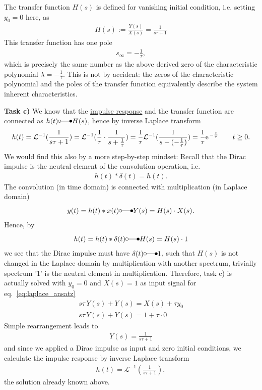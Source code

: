\documentclass[11pt,a4paper,DIV=12]{scrartcl}
\begin{document}
The transfer function $H(s)$ is defined for vanishing initial condition, i.e. setting $y_0=0$ here, as
\begin{align}
H(s) := \frac{Y(s)}{X(s)} = \frac{1}{s \tau + 1}
\end{align}
This transfer function has one pole
\begin{align}
s_\infty = -\frac{1}{\tau},
\end{align}
which is precisely the same number as the above derived zero of the characteristic polynomial $\lambda=-\frac{1}{\tau}$.
This is not by accident: the zeros of the characteristic polynomial and the poles of the transfer function equivalently describe the system inherent characteristics.

\textbf{Task c)} We know that the \underline{impulse response} and the transfer function are connected as $h(t) \laplace H(s)$, hence by inverse Laplace transform
\begin{align}
h(t) = \mathcal{L}^{-1}(\frac{1}{s \tau + 1}) = \mathcal{L}^{-1}(\frac{1}{\tau}\cdot\frac{1}{s + \frac{1}{\tau}})=
\frac{1}{\tau}\mathcal{L}^{-1}(\frac{1}{s -  (-\frac{1}{\tau})}) = \frac{1}{\tau}\e^{-\frac{t}{\tau}} \qquad t \geq 0.
\end{align}
%
We would find this also by a more step-by-step mindset:
Recall that the Dirac impulse is the neutral element of the convolution operation, i.e.
\begin{align}
h(t) \ast \delta(t) = h(t).
\end{align}
The convolution (in time domain) is connected with multiplication (in Laplace domain)
\begin{align}
y(t) = h(t) \ast x(t) \laplace Y(s) = H(s) \cdot X(s).
\end{align}
Hence, by
\begin{align}
h(t) = h(t)\ast \delta(t)	 \laplace H(s) = H(s) \cdot 1
\end{align}
we see that the Dirac impulse must have $\delta(t) \laplace 1$,
such that $H(s)$ is not changed in the Laplace domain by multiplication with another spectrum, trivially spectrum '1' is the neutral element in multiplication.
%
Therefore, task c) is actually solved with $y_0=0$ and $X(s)=1$ as input signal for eq.~\eqref{eq:laplace_ansatz}
\begin{align}
s \tau \, Y(s) + Y(s) = X(s) + \tau y_0\\
s \tau \, Y(s) + Y(s) = 1 + \tau \cdot 0
\end{align}
Simple rearrangement leads to
\begin{align}
Y(s) = \frac{1}{s \tau + 1}
\end{align}
and since we applied a Dirac impulse as input and zero initial conditions, we
calculate the impulse response by inverse Laplace transform
\begin{align}
h(t) = \mathcal{L}^{-1}(\frac{1}{s \tau + 1}),
\end{align}
the solution already known above.
\end{document}
